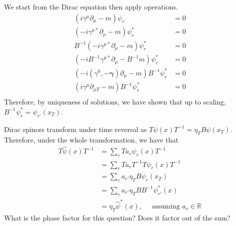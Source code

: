 \documentclass[11pt, oneside]{article}   	%
\theoremstyle{slanted}
\begin{document}
We start from the Dirac equation then 
apply operations. 
\begin{align*}
	\left( i \gamma ^ \mu \partial  _ \mu  - m  \right)  \psi _ r  &=  0  \\ 
	\left(   - i \gamma ^{ \mu * } \partial  _ \mu  - m  \right) \psi _ r ^ * &=  0  \\ 
	B ^{ - 1} \left(  - i \gamma ^{ \mu * } \partial  _ \mu  - m  \right)  \psi _ r ^ *  &  = 0  \\ 
	\left(  -i B ^{  -1 } \gamma ^{ \mu * } \partial  _ \mu  - B  ^{ - 1 } m    \right)  
	\psi _ r ^ *  &=  0  \\ 
	\left(  - i \left( \gamma^ 0 ,  - \mathbf{\gamma}  \right) \partial  _ \mu 
- m \right) B ^{ - 1 } \psi ^ * _ r  & = 0 \\ 
  \left( i \gamma ^ \mu \partial _{ \mu T }  - m  \right)  B ^{ - 1 } \psi ^ * _ r  &=  0  \\
\end{align*}
Therefore, by uniqueness of solutions, 
we have shown that up to scaling, $ B ^{  -1 } \psi ^{ * } _ r  = \psi_{ r  ' } 
\left( x  _ T  \right)  $. 

Dirac spinors 
transform under time reversal as $ T \psi \left( x  \right)  T ^{  -1 } 
 = \eta _ T  B \psi \left( x _ T  \right)  $. 
 Therefore, under the whole transformation, 
 we have that 
 \begin{align*}
	 T \hat{ \psi } \left( x  \right)  T^{ -1 } 
	 &=  \sum _ r T a _ r \psi _ r \left(  x  \right)  T ^{ - 1 }  \\ 
	 &=  \sum _ r T a _ r T ^{ - 1 } T \psi _ r \left( x  \right)  T ^{ - 1 }  \\ 
	 &=  \sum _ r a _{ r ' } \eta _ T B \psi _r \left( x _ T   \right)  \\
	 &=  \sum _ r a _{ r ' } \eta _ T B B^{ - 1 } \psi _{ r  ' } ^ * \left(  x  \right)  \\
	 &=  \eta _ T \hat{ \psi }^ *  \left( x  \right)   , \quad 
	 \text{ assuming } a_ r \in \mathbb{ R }
 \end{align*}
 What is the phase factor 
 for this question? Does it factor out of the sum?
\end{document}
